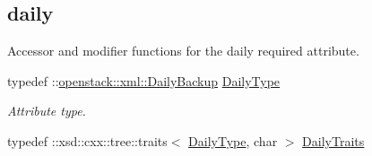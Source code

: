 \subsection*{daily}
\label{_amgrpbea79186fd7af2da67e59b4b15df5a26}
Accessor and modifier functions for the daily required attribute. \begin{DoxyCompactItemize}
\item 
\hypertarget{classopenstack_1_1xml_1_1BackupSchedule_a04ace106b568cd4ff79789f76c20e080}{
typedef ::\hyperlink{classopenstack_1_1xml_1_1DailyBackup}{openstack::xml::DailyBackup} \hyperlink{classopenstack_1_1xml_1_1BackupSchedule_a04ace106b568cd4ff79789f76c20e080}{DailyType}}
\label{classopenstack_1_1xml_1_1BackupSchedule_a04ace106b568cd4ff79789f76c20e080}

\begin{DoxyCompactList}\small\item\em Attribute type. \item\end{DoxyCompactList}\item 
\hypertarget{classopenstack_1_1xml_1_1BackupSchedule_a7af205ecf7dcce02e6407a28936106cd}{
typedef ::xsd::cxx::tree::traits$<$ \hyperlink{classopenstack_1_1xml_1_1DailyBackup}{DailyType}, char $>$ \hyperlink{classopenstack_1_1xml_1_1BackupSchedule_a7af205ecf7dcce02e6407a28936106cd}{DailyTraits}}
\label{classopenstack_1_1xml_1_1BackupSchedule_a7af205ecf7dcce02e6407a28936106cd}


\end{DoxyCompactItemize}
